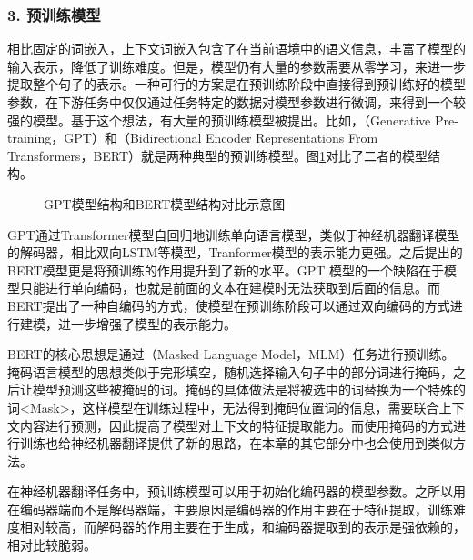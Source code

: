 \subsubsection{3. 预训练模型}

\parinterval 相比固定的词嵌入，上下文词嵌入包含了在当前语境中的语义信息，丰富了模型的输入表示，降低了训练难度。但是，模型仍有大量的参数需要从零学习，来进一步提取整个句子的表示。一种可行的方案是在预训练阶段中直接得到预训练好的模型参数，在下游任务中仅仅通过任务特定的数据对模型参数进行微调，来得到一个较强的模型。基于这个想法，有大量的预训练模型被提出。比如，{\small{}}（Generative Pre-training，GPT）和{\small{}}（Bidirectional Encoder Representations From Transformers，BERT）就是两种典型的预训练模型。图\ref{fig:16-5}对比了二者的模型结构。

\begin{figure}[htp]
    \centering
    
    \caption{GPT模型结构和BERT模型结构对比示意图}
    \label{fig:16-5}
\end{figure}

\parinterval GPT通过Transformer模型自回归地训练单向语言模型，类似于神经机器翻译模型的解码器，相比双向LSTM等模型，Tranformer模型的表示能力更强。之后提出的BERT模型更是将预训练的作用提升到了新的水平。GPT 模型的一个缺陷在于模型只能进行单向编码，也就是前面的文本在建模时无法获取到后面的信息。而BERT提出了一种自编码的方式，使模型在预训练阶段可以通过双向编码的方式进行建模，进一步增强了模型的表示能力。

\parinterval BERT的核心思想是通过{\small{}}（Masked Language Model，MLM）任务进行预训练。掩码语言模型的思想类似于完形填空，随机选择输入句子中的部分词进行掩码，之后让模型预测这些被掩码的词。掩码的具体做法是将被选中的词替换为一个特殊的词<Mask>，这样模型在训练过程中，无法得到掩码位置词的信息，需要联合上下文内容进行预测，因此提高了模型对上下文的特征提取能力。而使用掩码的方式进行训练也给神经机器翻译提供了新的思路，在本章的其它部分中也会使用到类似方法。

\parinterval 在神经机器翻译任务中，预训练模型可以用于初始化编码器的模型参数。之所以用在编码器端而不是解码器端，主要原因是编码器的作用主要在于特征提取，训练难度相对较高，而解码器的作用主要在于生成，和编码器提取到的表示是强依赖的，相对比较脆弱。

